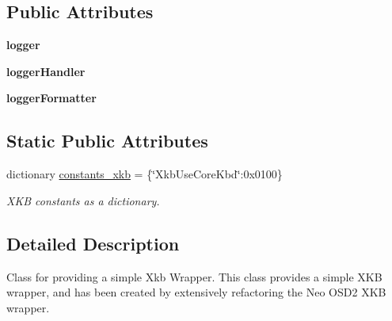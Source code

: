 \subsection*{Public Attributes}
\begin{DoxyCompactItemize}
\item 
\hypertarget{classutils_1_1xkb_1_1XkbWrapper_1_1XkbWrapper_a540d50a94a9cff392a040bd5dc79ed1b}{
{\bfseries logger}}
\label{classutils_1_1xkb_1_1XkbWrapper_1_1XkbWrapper_a540d50a94a9cff392a040bd5dc79ed1b}

\item 
\hypertarget{classutils_1_1xkb_1_1XkbWrapper_1_1XkbWrapper_a03e444c8aaa7bb6d6217097921e28443}{
{\bfseries loggerHandler}}
\label{classutils_1_1xkb_1_1XkbWrapper_1_1XkbWrapper_a03e444c8aaa7bb6d6217097921e28443}

\item 
\hypertarget{classutils_1_1xkb_1_1XkbWrapper_1_1XkbWrapper_aae33581ab1e443913bec0099e53cb7d7}{
{\bfseries loggerFormatter}}
\label{classutils_1_1xkb_1_1XkbWrapper_1_1XkbWrapper_aae33581ab1e443913bec0099e53cb7d7}

\end{DoxyCompactItemize}
\subsection*{Static Public Attributes}
\begin{DoxyCompactItemize}
\item 
\hypertarget{classutils_1_1xkb_1_1XkbWrapper_1_1XkbWrapper_a760b0af33b4ee9f4f0a8e6771c87c8ff}{
dictionary \hyperlink{classutils_1_1xkb_1_1XkbWrapper_1_1XkbWrapper_a760b0af33b4ee9f4f0a8e6771c87c8ff}{constants\_\-xkb} = \{\char`\"{}XkbUseCoreKbd\char`\"{}:0x0100\}}
\label{classutils_1_1xkb_1_1XkbWrapper_1_1XkbWrapper_a760b0af33b4ee9f4f0a8e6771c87c8ff}

\begin{DoxyCompactList}\small\item\em XKB constants as a dictionary. \item\end{DoxyCompactList}\end{DoxyCompactItemize}


\subsection{Detailed Description}
Class for providing a simple Xkb Wrapper. This class provides a simple XKB wrapper, and has been created by extensively refactoring the Neo OSD2 XKB wrapper.

